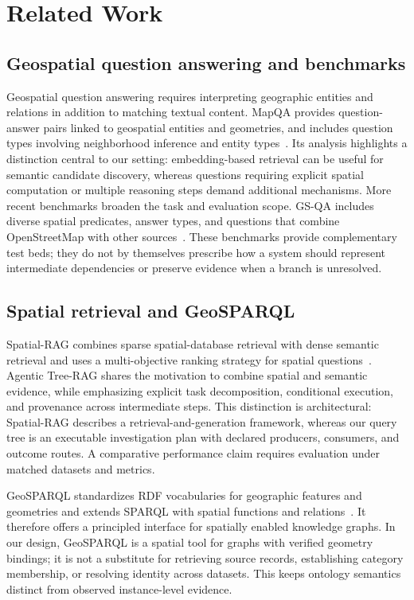 \section{Related Work}\label{sec:related-work}

\subsection{Geospatial question answering and benchmarks}
Geospatial question answering requires interpreting geographic entities and relations in addition to matching textual content. MapQA provides question-answer pairs linked to geospatial entities and geometries, and includes question types involving neighborhood inference and entity types~\cite{li2025mapqa}. Its analysis highlights a distinction central to our setting: embedding-based retrieval can be useful for semantic candidate discovery, whereas questions requiring explicit spatial computation or multiple reasoning steps demand additional mechanisms. More recent benchmarks broaden the task and evaluation scope. GS-QA includes diverse spatial predicates, answer types, and questions that combine OpenStreetMap with other sources~\cite{saeedan2026gsqa}. These benchmarks provide complementary test beds; they do not by themselves prescribe how a system should represent intermediate dependencies or preserve evidence when a branch is unresolved.

\subsection{Spatial retrieval and GeoSPARQL}
Spatial-RAG combines sparse spatial-database retrieval with dense semantic retrieval and uses a multi-objective ranking strategy for spatial questions~\cite{yu2025spatialrag}. Agentic Tree-RAG shares the motivation to combine spatial and semantic evidence, while emphasizing explicit task decomposition, conditional execution, and provenance across intermediate steps. This distinction is architectural: Spatial-RAG describes a retrieval-and-generation framework, whereas our query tree is an executable investigation plan with declared producers, consumers, and outcome routes. A comparative performance claim requires evaluation under matched datasets and metrics.

GeoSPARQL standardizes RDF vocabularies for geographic features and geometries and extends SPARQL with spatial functions and relations~\cite{ogc2023geosparql}. It therefore offers a principled interface for spatially enabled knowledge graphs. In our design, GeoSPARQL is a spatial tool for graphs with verified geometry bindings; it is not a substitute for retrieving source records, establishing category membership, or resolving identity across datasets. This keeps ontology semantics distinct from observed instance-level evidence.

